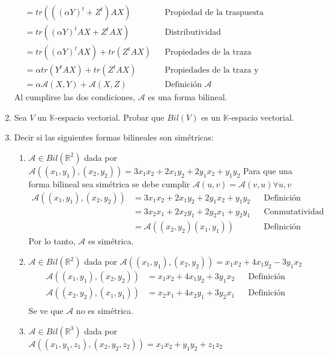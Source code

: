 \documentclass{article}
\newcommand{\R}{\mathbb{R}}
\newcommand{\A}{\mathcal{A}}
\begin{document}
\begin{enumerate}
\begin{align*}
                &=tr(((\alpha Y)^t+Z^t)AX)&&\text{Propiedad de la traspuesta}\\
                &=tr((\alpha Y)^tAX+Z^tAX)&&\text{Distributividad}\\
                &=tr((\alpha Y)^tAX)+tr(Z^tAX)&&\text{Propiedades de la traza}\\
                &=\alpha tr(Y^tAX)+tr(Z^tAX)&&\text{Propiedades de la traza y traspuesta}\\
                &=\alpha\A(X,Y)+\A(X,Z)&&\text{Definición }\A
            \end{align*}
            Al cumplirse las dos condiciones, $\A$ es una forma bilineal.
        \item Sea $V$ un $\mathbb{K}$-espacio vectorial. Probar que $Bil(V)$ es un $\mathbb{K}$-espacio vectorial.
        \item Decir si las siguientes formas bilineales son simétricas:
            \begin{enumerate}
                \item $\A\in Bil(\R^2)$ dada por $\A((x_1,y_1),(x_2,y_2))=3x_1x_2+2x_1y_2+2y_1x_2+y_1y_2$
                    Para que una forma bilineal sea simétrica se debe cumplir $\A(u,v)=\A(v,u)\forall u,v$
                    \begin{align*}
                        \A((x_1,y_1),(x_2,y_2))&=3x_1x_2+2x_1y_2+2y_1x_2+y_1y_2&&\text{Definición}\\
                        &=3x_2x_1+2x_2y_1+2y_2x_1+y_2y_1&&\text{Conmutatividad suma y prod}\\
                        &=\A((x_2,y_2)(x_1,y_1))&&\text{Definición}
                    \end{align*}
                    Por lo tanto, $\A$ es simétrica.
                \item $\A\in Bil(\R^2)$ dada por $\A((x_1,y_1),(x_2,y_2))=x_1x_2+4x_1y_2-3y_1x_2$
                    \begin{align*}
                        \A((x_1,y_1),(x_2,y_2))&=x_1x_2+4x_1y_2+3y_1x_2&&\text{Definición}\\
                        \A((x_2,y_2),(x_1,y_1))&=x_2x_1+4x_2y_1+3y_2x_1&&\text{Definición}\\
                    \end{align*}
                    Se ve que $\A$ no es simétrica.
                \item $\A\in Bil(\R^3)$ dada por $\A((x_1,y_1,z_1),(x_2,y_2,z_2))=x_1x_2+y_1y_2+z_1z_2$
                    \begin{align*}

\end{align*}
\end{enumerate}
\end{enumerate}
\end{document}

